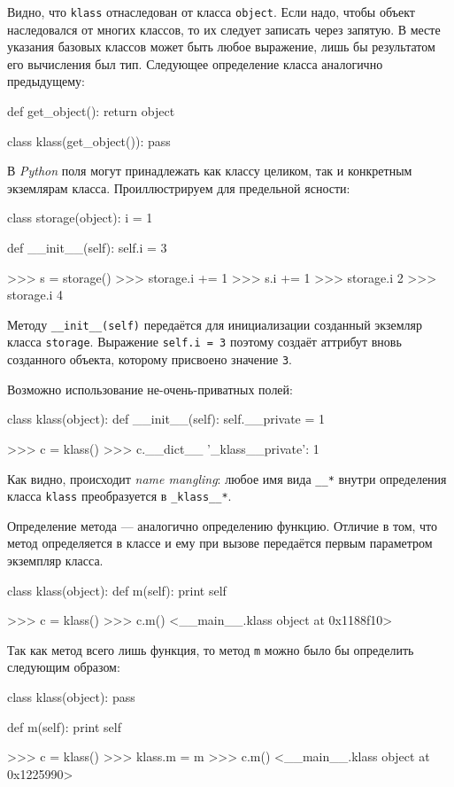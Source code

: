 Видно, что \lstinline{klass} отнаследован от класса \lstinline{object}. Если надо, чтобы объект наследовался от многих классов, то их следует записать через запятую. В месте указания базовых классов может быть любое выражение, лишь бы результатом его вычисления был тип. Следующее определение класса аналогично предыдущему:
\begin{pylst}{}{}
def get_object():
    return object

class klass(get_object()):
    pass
\end{pylst}

В \emph{Python} поля могут принадлежать как классу целиком, так и конкретным экземлярам класса. Проиллюстрируем для предельной ясности:
\begin{pylst}{}{}
class storage(object):
    i = 1

    def __init__(self):
        self.i = 3

>>> s = storage()
>>> storage.i += 1
>>> s.i += 1
>>> storage.i
2
>>> storage.i
4
\end{pylst}

Методу \lstinline{__init__(self)} передаётся для инициализации созданный экземляр класса \lstinline{storage}. Выражение \lstinline{self.i = 3} поэтому создаёт аттрибут вновь созданного объекта, которому присвоено значение \lstinline{3}.

Возможно использование не-очень-приватных полей:
\begin{pylst}{}{}
class klass(object):
    def __init__(self):
        self.__private = 1

>>> c = klass()
>>> c.__dict__
{'_klass__private': 1}
\end{pylst}

Как видно, происходит \emph{name mangling}: любое имя вида \lstinline{__*} внутри определения класса \lstinline{klass} преобразуется в \lstinline{_klass__*}.

Определение метода — аналогично определению функцию. Отличие в том, что метод определяется в классе и ему при вызове передаётся первым параметром экземпляр класса.
\begin{pylst}{}{}
class klass(object):
    def m(self):
        print self

>>> c = klass()
>>> c.m()
<__main__.klass object at 0x1188f10>
\end{pylst}

Так как метод всего лишь функция, то метод \lstinline{m} можно было бы определить следующим образом:
\begin{pylst}{}{}
class klass(object):
    pass

def m(self):
    print self

>>> c = klass()
>>> klass.m = m
>>> c.m()
<__main__.klass object at 0x1225990>
\end{pylst}

